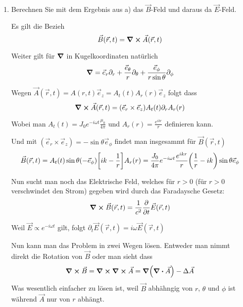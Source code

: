 \begin{enumerate}[label=\alph*)]
  \item Berechnen Sie mit dem Ergebnis aus a) das $\vec B$-Feld und
    daraus da $\vec E$-Feld.

    Es gilt die Bezieh
    \begin{equation}
      \vec B(\vec r, t)= \curl \vec A(\vec r, t)
    \end{equation}

    Weiter gilt für $\grad$ in Kugelkoordinaten natürlich
    \begin{equation*}
      \grad = \vec e_r \partial_r + \frac{\vec e_\theta}{r}\partial_\theta 
      + \frac{\vec e_\phi}{r\sin\theta}\partial_\phi
    \end{equation*}
    
    Wegen $\vec A(\vec r, t)=A(r, t)\vec e_z = A_t(t)A_r(r)\vec e_z$ folgt
    dass
    \begin{equation}
      \curl \vec A(\vec r, t) 
      =(\vec e_r \times \vec e_z) A_t(t)\partial_r A_r(r)
    \end{equation}

    Wobei man $A_t(t)=J_0 e^{-i\omega t}\frac{\mu_0}{4\pi}$ und
    $A_r(r)=\frac{e^{ikr}}{r}$ definieren kann.

    Und mit $(\vec e_r\times\vec e_z)=-\sin\theta \vec e_\phi$ findet man 
    insgesammt für $\vec B(\vec r, t)$
    \begin{equation}
      \vec B(\vec r, t)=A_t(t)\sin\theta(-\vec e_\phi)
      \qty[ik-\frac{1}{r}]A_r(r)
      = \frac{J_0}{4\pi}e^{-i\omega t}\frac{e^{ikr}}{r} 
      \qty(\frac{1}{r} -ik)\sin\theta\vec e_\phi
    \end{equation}
    
    Nun sucht man noch das Elektrische Feld, welches für $r>0$ 
    (für $r>0$ verschwindet den Strom) gegeben wird
    durch das Faradaysche Gesetz:
    \begin{equation}
      \curl \vec B(\vec r, t)= \frac{1}{c^2} \pdv t \vec E(\vec r, t) 
    \end{equation}
    
    Weil $\vec E\propto e^{-i\omega t}$ gilt, folgt 
    $\partial_t \vec E(\vec r, t)=i\omega \vec E(\vec r, t)$

    Nun kann man das Problem in zwei Wegen lösen. Entweder man nimmt direkt
    die Rotation von $\vec B$ oder man sieht dass
    \begin{equation}
      \curl\vec B=\curl\curl\vec A=\grad(\div\vec A)-\Delta \vec A
    \end{equation}
    Was wesentlich einfacher zu lösen ist, weil $\vec B$ abhähngig von
    $r$, $\theta$ und $\phi$ ist während $\vec A$ nur von $r$ abhängt.


\end{enumerate}
